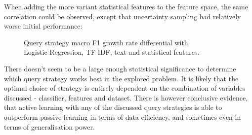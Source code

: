 \documentclass[a4paper,12pt]{article}
\begin{document}
When adding the more variant statistical features to the feature space, the same correlation could be observed, except that uncertainty sampling had relatively worse initial performance:
\begin{figure}[H]
\captionsetup{justification=centering}
    \centering
    
    \caption{\label{fig:lr-26k-stats}Query strategy macro F1 growth rate differential with\\Logistic Regression, TF-IDF, text and statistical features.}
\end{figure}
There doesn't seem to be a large enough statistical significance to determine which query strategy works best in the explored problem. It is likely that the optimal choice of strategy is entirely dependent on the combination of variables discussed - classifier, features and dataset. There is however conclusive evidence, that active learning with any of the discussed query strategies is able to outperform passive learning in terms of data efficiency, and sometimes even in terms of generalisation power.
\newpage
\end{document}
